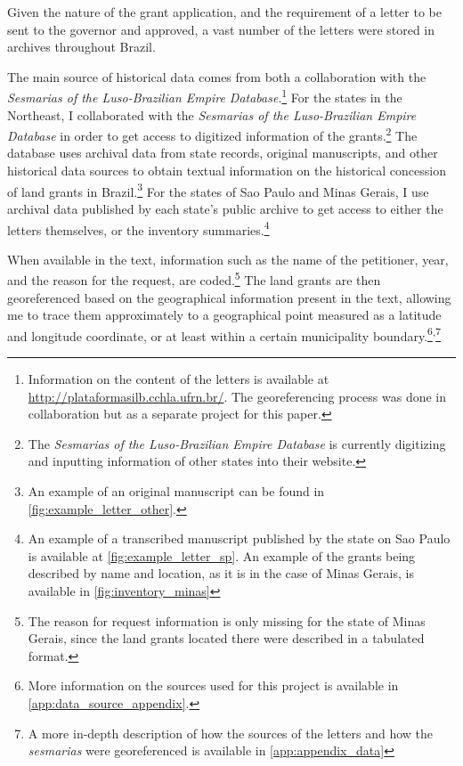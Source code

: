 \documentclass{article}
\begin{document}
Given the nature of the grant application, and the requirement of a letter to be sent to the governor and approved, a vast number of the letters were stored in archives throughout Brazil. 

The main source of historical data comes from both a collaboration with the \textit{Sesmarias of the Luso-Brazilian Empire Database}.\footnote{
  Information on the content of the letters is available at \url{http://plataformasilb.cchla.ufrn.br/}. The georeferencing process was done in collaboration but as a separate project for this paper.}
For the states in the Northeast, I collaborated with the \textit{Sesmarias of the Luso-Brazilian Empire Database} in order to get access to digitized information of the grants.\footnote{The \textit{Sesmarias of the Luso-Brazilian Empire Database} is currently digitizing and inputting information of other states into their website.}
The database uses archival data from state records, original manuscripts, and other historical data sources to obtain textual information on the historical concession of land grants in Brazil.\footnote{An example of an original manuscript can be found in \autoref{fig:example_letter_other}.} For the states of Sao Paulo and Minas Gerais, I use archival data published by each state's public archive to get access to either the letters themselves, or the inventory summaries.\footnote{An example of a transcribed manuscript published by the state on Sao Paulo is available at \autoref{fig:example_letter_sp}. An example of the grants being described by name and location, as it is in the case of Minas Gerais, is available in \autoref{fig:inventory_minas}}

When available in the text, information such as the name of the petitioner, year, and the reason for the request, are coded.\footnote{The reason for request information is only missing for the state of Minas Gerais, since the land grants located there were described in a tabulated format.}
The land grants are then georeferenced based on the geographical information present in the text, allowing me to trace them approximately to a geographical point measured as a latitude and longitude coordinate, or at least within a certain municipality boundary.\footnote{More information on the sources used for this project is available in \autoref{app:data_source_appendix}.}\textsuperscript{,}\footnote{A more in-depth description of how the sources of the letters and how the \textit{sesmarias} were georeferenced is available in \autoref{app:appendix_data}}
\end{document}
